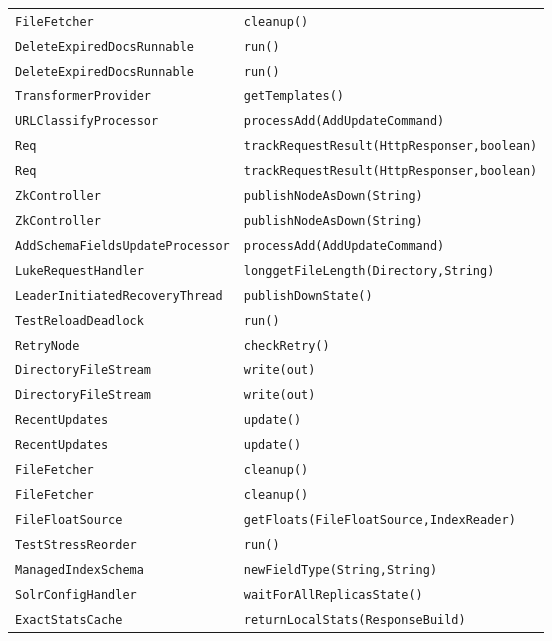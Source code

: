 \begin{center}
\begin{longtable}{ll}
\lstinline/FileFetcher/&{\lstinline/cleanup()/}\\
\lstinline/DeleteExpiredDocsRunnable/&{\lstinline/run()/}\\
\lstinline/DeleteExpiredDocsRunnable/&{\lstinline/run()/}\\
\lstinline/TransformerProvider/&{\lstinline/getTemplates()/}\\
\lstinline/URLClassifyProcessor/&{\lstinline/processAdd(AddUpdateCommand)/}\\
\lstinline/Req/&{\lstinline/trackRequestResult(HttpResponser,boolean)/}\\
\lstinline/Req/&{\lstinline/trackRequestResult(HttpResponser,boolean)/}\\
\lstinline/ZkController/&{\lstinline/publishNodeAsDown(String)/}\\
\lstinline/ZkController/&{\lstinline/publishNodeAsDown(String)/}\\
\lstinline/AddSchemaFieldsUpdateProcessor/&{\lstinline/processAdd(AddUpdateCommand)/}\\
\lstinline/LukeRequestHandler/&{\lstinline/longgetFileLength(Directory,String)/}\\
\lstinline/LeaderInitiatedRecoveryThread/&{\lstinline/publishDownState()/}\\
\lstinline/TestReloadDeadlock/&{\lstinline/run()/}\\
\lstinline/RetryNode/&{\lstinline/checkRetry()/}\\
\lstinline/DirectoryFileStream/&{\lstinline/write(out)/}\\
\lstinline/DirectoryFileStream/&{\lstinline/write(out)/}\\
\lstinline/RecentUpdates/&{\lstinline/update()/}\\
\lstinline/RecentUpdates/&{\lstinline/update()/}\\
\lstinline/FileFetcher/&{\lstinline/cleanup()/}\\
\lstinline/FileFetcher/&{\lstinline/cleanup()/}\\
\lstinline/FileFloatSource/&{\lstinline/getFloats(FileFloatSource,IndexReader)/}\\
\lstinline/TestStressReorder/&{\lstinline/run()/}\\
\lstinline/ManagedIndexSchema/&{\lstinline/newFieldType(String,String)/}\\
\lstinline/SolrConfigHandler/&{\lstinline/waitForAllReplicasState()/}\\
\lstinline/ExactStatsCache/&{\lstinline/returnLocalStats(ResponseBuild)/}\\

\end{longtable}
\end{center}
